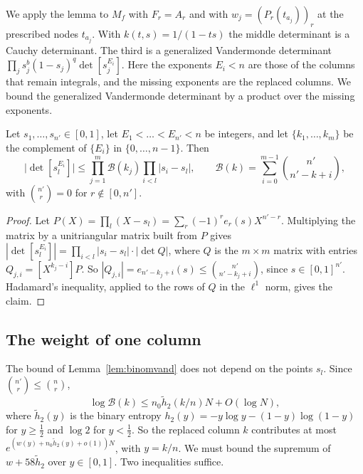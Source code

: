 We apply the lemma to $M_f$ with $F_r=A_r$ and with $w_j=(P_r(t_{a_j}))_r$ at the prescribed nodes $t_{a_j}$.
With $k(t,s)=1/(1-ts)$ the middle determinant is a Cauchy determinant. The third is a generalized
Vandermonde determinant $\prod_js_j^b(1-s_j)^q\det[s_j^{E_i}]$. Here the exponents $E_i<n$ are those of the
columns that remain integrals, and the missing exponents are the replaced columns. We bound the generalized
Vandermonde determinant by a product over the missing exponents.

\begin{lemma}\label{lem:binomvand}
Let $s_1,\ldots,s_{n'}\in[0,1]$, let $E_1<\dots<E_{n'}<n$ be integers, and let $\{k_1,\ldots,k_m\}$ be the
complement of $\{E_i\}$ in $\{0,\ldots,n-1\}$. Then
\[
 \bigl|\det[s_l^{E_i}]\bigr|\le\prod_{j=1}^m\mathcal B(k_j)\prod_{i<l}|s_i-s_l|,\qquad
 \mathcal B(k)=\sum_{i=0}^{m-1}\binom{n'}{n'-k+i},
\]
with $\binom{n'}r=0$ for $r\notin[0,n']$.
\end{lemma}

\begin{proof}
Let $P(X)=\prod_l(X-s_l)=\sum_r(-1)^re_r(s)X^{n'-r}$. Multiplying the matrix by a unitriangular matrix built
from $P$ gives $|\det[s_l^{E_i}]|=\prod_{i<l}|s_i-s_l|\cdot|\det Q|$, where $Q$ is the $m\times m$ matrix with
entries $Q_{j,i}=[X^{k_j-i}]P$. So $|Q_{j,i}|=e_{n'-k_j+i}(s)\le\binom{n'}{n'-k_j+i}$, since $s\in[0,1]^{n'}$.
Hadamard's inequality, applied to the rows of $Q$ in the $\ell^1$ norm, gives the claim.
\end{proof}

\subsection{The weight of one column}\label{ssec:weights}
The bound of Lemma~\ref{lem:binomvand} does not depend on the points $s_l$. Since $\binom{n'}r\le\binom nr$,
\[
 \log\mathcal B(k)\le n_0\tilde h_2(k/n)N+O(\log N),
\]
where $\tilde h_2(y)$ is the binary entropy $h_2(y)=-y\log y-(1-y)\log(1-y)$ for $y\ge\frac12$ and $\log2$ for
$y<\frac12$. So the replaced column $k$ contributes at most $e^{(w(y)+n_0\tilde h_2(y)+o(1))N}$, with $y=k/n$.
We must bound the supremum of $w+58\tilde h_2$ over $y\in[0,1]$. Two inequalities suffice.

